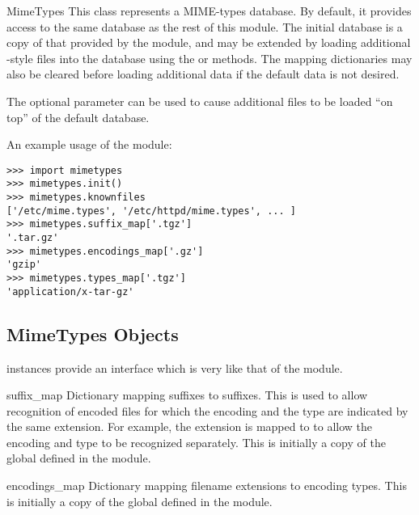 \begin{classdesc}{MimeTypes}{}
  This class represents a MIME-types database.  By default, it
  provides access to the same database as the rest of this module.
  The initial database is a copy of that provided by the module, and
  may be extended by loading additional -style files
  into the database using the  or 
  methods.  The mapping dictionaries may also be cleared before
  loading additional data if the default data is not desired.

  The optional  parameter can be used to cause
  additional files to be loaded ``on top'' of the default database.

\end{classdesc}

An example usage of the module:

\begin{verbatim}
>>> import mimetypes
>>> mimetypes.init()
>>> mimetypes.knownfiles
['/etc/mime.types', '/etc/httpd/mime.types', ... ]
>>> mimetypes.suffix_map['.tgz']
'.tar.gz'
>>> mimetypes.encodings_map['.gz']
'gzip'
>>> mimetypes.types_map['.tgz']
'application/x-tar-gz'
\end{verbatim}

\subsection{MimeTypes Objects \label{mimetypes-objects}}

 instances provide an interface which is very like
that of the  module.

\begin{datadesc}{suffix_map}
  Dictionary mapping suffixes to suffixes.  This is used to allow
  recognition of encoded files for which the encoding and the type are
  indicated by the same extension.  For example, the 
  extension is mapped to  to allow the encoding and type
  to be recognized separately.  This is initially a copy of the global
   defined in the module.
\end{datadesc}

\begin{datadesc}{encodings_map}
  Dictionary mapping filename extensions to encoding types.  This is
  initially a copy of the global  defined in the
  module.
\end{datadesc}

